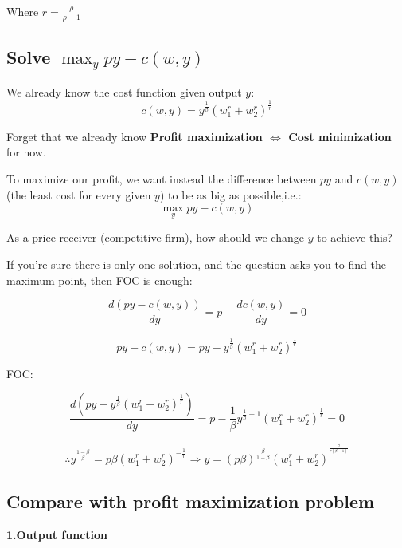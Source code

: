 \documentclass{article}
\begin{document}
Where $r = \frac{\rho}{\rho -1}$

\subsection{Solve $\max_y py - c(w, y)$ }

\begin{mdframed}[backgroundcolor=blue!20,linecolor=white]

We already know the cost function given output $y$:
$$c(w,y) = y^{\frac{1}{\beta}}{(w_1^r + w_2^r)^{\frac{1}{r}}} $$

Forget that we already know \textbf{Profit maximization $\iff$  Cost minimization} for now.

To maximize our profit, we want instead the difference between $py$ and $c(w,y)$ \\ (the least cost for every given $y$) to be as big as possible,i.e.:
$$\max_{y} py - c(w,y)$$

As a price receiver (competitive firm), how should we change $y$ to achieve this?

If you're sure there is only one solution, and the question asks you to find the maximum point, then FOC is enough:

$$\frac{d(py - c(w,y))}{dy} = p - \frac{dc(w,y)}{dy}=0$$


\end{mdframed}

$$py - c(w, y) = py - y^{\frac{1}{\beta}}{(w_1^r + w_2^r)^{\frac{1}{r}}} $$

FOC:

$$\frac{d(py - y^{\frac{1}{\beta}}{(w_1^r + w_2^r)^{\frac{1}{r}}})}{dy}= p - \frac{1}{\beta}y^{\frac{1}{\beta} - 1} (w_1^r + w_2^r)^{\frac{1}{r}} = 0$$

\begin{equation}
\therefore y^{\frac{1- \beta}{\beta}} = p \beta (w_1^r + w_2^r)^{-\frac{1}{r}}  \Rightarrow y =  (p \beta)^{\frac{\beta}{1- \beta}} (w_1^r + w_2^r)^{^{\frac{\beta}{r(\beta - 1)}}}
    \label{eq:check1}   
\end{equation}

\subsection{Compare with profit maximization problem}

\textbf{1.Output function}
\end{document}
